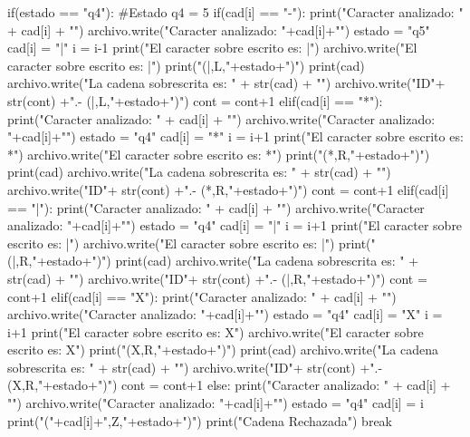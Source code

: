 \documentclass{article}
\begin{document}
\begin{python}
					if(estado == "q4"): #Estado q4 = 5
						if(cad[i] == "-"):
							print("Caracter analizado: " + cad[i] + "\n")
							archivo.write("Caracter analizado: "+cad[i]+"\n")
							estado = "q5"
							cad[i] = "|"
							i = i-1
							print("El caracter sobre escrito es: |\n")
							archivo.write("El caracter sobre escrito es: |\n")
							print("(|,L,"+estado+")\n")
							print(cad)
							archivo.write("La cadena sobrescrita es: " + str(cad) + "\n")
							archivo.write("ID"+ str(cont) +".- (|,L,"+estado+")\n\n")
							cont = cont+1
						elif(cad[i] == "*"):
							print("Caracter analizado: " + cad[i] + "\n")
							archivo.write("Caracter analizado: "+cad[i]+"\n")
							estado = "q4"
							cad[i] = "*"
							i = i+1
							print("El caracter sobre escrito es: *\n")
							archivo.write("El caracter sobre escrito es: *\n")
							print("(*,R,"+estado+")\n")
							print(cad)
							archivo.write("La cadena sobrescrita es: " + str(cad) + "\n")
							archivo.write("ID"+ str(cont) +".- (*,R,"+estado+")\n\n")
							cont = cont+1
						elif(cad[i] == "|"):
							print("Caracter analizado: " + cad[i] + "\n")
							archivo.write("Caracter analizado: "+cad[i]+"\n")
							estado = "q4"
							cad[i] = "|"
							i = i+1
							print("El caracter sobre escrito es: |\n")
							archivo.write("El caracter sobre escrito es: |\n")
							print("(|,R,"+estado+")\n")
							print(cad)
							archivo.write("La cadena sobrescrita es: " + str(cad) + "\n")
							archivo.write("ID"+ str(cont) +".- (|,R,"+estado+")\n\n")
							cont = cont+1
						elif(cad[i] == "X"):
							print("Caracter analizado: " + cad[i] + "\n")
							archivo.write("Caracter analizado: "+cad[i]+"\n")
							estado = "q4"
							cad[i] = "X"
							i = i+1
							print("El caracter sobre escrito es: X\n")
							archivo.write("El caracter sobre escrito es: X\n")
							print("(X,R,"+estado+")\n")
							print(cad)
							archivo.write("La cadena sobrescrita es: " + str(cad) + "\n")
							archivo.write("ID"+ str(cont) +".- (X,R,"+estado+")\n\n")
							cont = cont+1
						else:
							print("Caracter analizado: " + cad[i] + "\n")
							archivo.write("Caracter analizado: "+cad[i]+"\n")
							estado = "q4"
							cad[i] = i
							print("("+cad[i]+",Z,"+estado+")\n")
							print("Cadena Rechazada")
							break 
				

\end{python}
\end{document}
